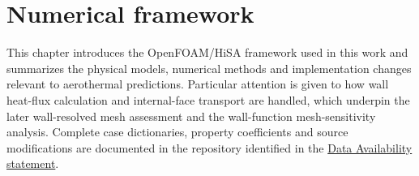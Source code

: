 \chapter{Numerical framework}
\label{chap:numerical-framework}

This chapter introduces the OpenFOAM/HiSA framework used in this work and
summarizes the physical models, numerical methods and implementation changes
relevant to aerothermal predictions. Particular attention is given to how wall heat-flux
calculation and internal-face transport are handled, which underpin the later wall-resolved mesh
assessment and the wall-function mesh-sensitivity analysis. Complete case dictionaries, property coefficients and source modifications are documented in the repository identified in the
\hyperref[chap:data-avail]{Data Availability statement}.







